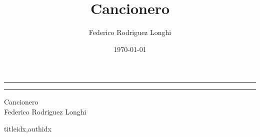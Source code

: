 \documentclass[12pt,a4paper]{article}
\newcommand{\autor}{Federico Rodriguez Longhi}
\begin{document}
\title{Cancionero}
\author{Federico Rodriguez Longhi}		
\date{\today}

\begin{titlepage}
\centering
\rule{\textwidth}{1pt}\par %
\vspace{2pt}\vspace{-\baselineskip} %
\rule{\textwidth}{0.4pt}\par %
\vspace{20pt}
\Huge{Cancionero}\\
\vfill
\large{\autor}
\end{titlepage}

\begin{songs}{titleidx,authidx}

\end{songs}
\end{document}
